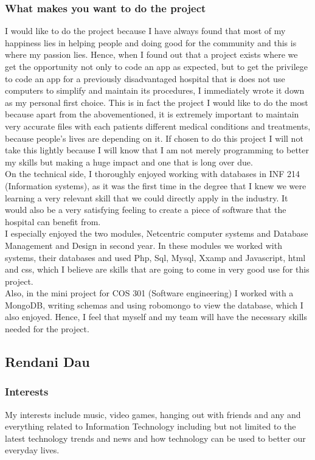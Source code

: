 \documentclass[hidelinks, 12pt, oneside]{article}
\begin{document}
\subsubsection{What makes you want to do the project}
I would like to do the project because I have always found that most of my happiness lies in helping people and doing good for the community and this is where my passion lies.  Hence, when I found out that a project exists where we get the opportunity not only to code an app as expected, but to get the privilege to code an app for a previously disadvantaged hospital that is does not use computers to simplify and maintain its procedures, I immediately wrote it down as my personal first choice. This is in fact the project I would like to do the most because apart from the abovementioned, it is extremely important to maintain very accurate files with each patients different medical conditions and treatments, because people's lives are depending on it. If chosen to do this project I will not take this lightly because I will know that I am not merely programming to better my skills but making a huge impact and one that is long over due. 
\\
On the technical side, I thoroughly enjoyed working with databases in INF 214 (Information systems), as it was the first time in the degree that I knew we were learning a very relevant skill that we could directly apply in the industry. It would also be a very satisfying feeling to create a piece of software that the hospital can benefit from.
\\
I especially enjoyed the two modules, Netcentric computer systems and Database Management and Design in second year. In these modules we worked with systems, their databases and used Php, Sql, Mysql, Xxamp and Javascript, html and css, which I believe are skills that are going to come in very good use for this project. 
\\
Also, in the mini project for COS 301 (Software engineering) I worked with a MongoDB, writing schemas and using robomongo to view the database, which I also enjoyed. Hence, I feel that myself and my team will have the necessary skills needed for the project. 
\\
\subsection{Rendani Dau}
\subsubsection{Interests}
My interests include music, video games, hanging out with friends and any and everything related to Information Technology including but not limited to the latest technology trends and news and how technology can be used to better our everyday lives.
\end{document}
